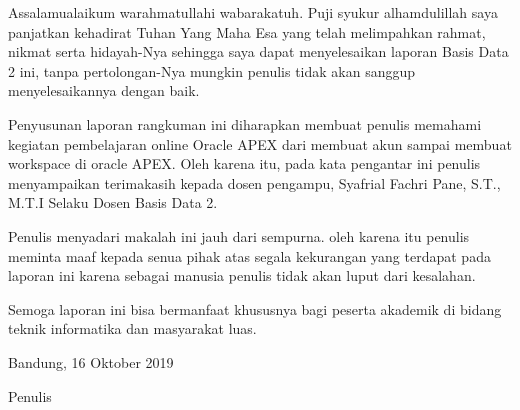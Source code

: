 \begin{acknowledgements}
Assalamualaikum warahmatullahi wabarakatuh. Puji syukur alhamdulillah saya panjatkan kehadirat Tuhan Yang Maha Esa yang telah melimpahkan rahmat, nikmat serta hidayah-Nya sehingga saya dapat menyelesaikan laporan Basis Data 2 ini, tanpa pertolongan-Nya mungkin penulis tidak akan sanggup menyelesaikannya dengan baik.

Penyusunan laporan rangkuman ini diharapkan membuat penulis memahami kegiatan pembelajaran online Oracle APEX dari membuat akun sampai membuat workspace di oracle APEX. Oleh karena itu, pada kata pengantar ini penulis menyampaikan terimakasih kepada dosen pengampu, Syafrial Fachri Pane, S.T., M.T.I Selaku Dosen Basis Data 2.

Penulis menyadari makalah ini jauh dari sempurna. oleh karena itu penulis meminta maaf kepada senua pihak atas segala kekurangan yang terdapat pada laporan ini karena sebagai manusia penulis tidak akan luput dari kesalahan.

Semoga laporan ini bisa bermanfaat khususnya bagi peserta akademik di bidang teknik informatika dan masyarakat luas.

\begin{raggedleft}

Bandung, 16 Oktober 2019

Penulis

\end{raggedleft}

\end{acknowledgements}